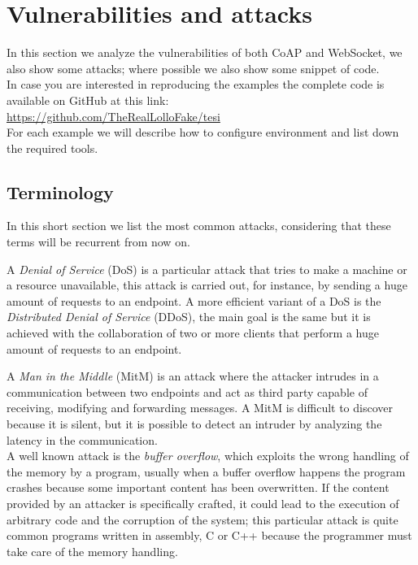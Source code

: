 	\chapter{Vulnerabilities and attacks}\label{ch:vuln}
	In this section we analyze the vulnerabilities of both CoAP and WebSocket, we also show some attacks;
	where possible we also show some snippet of code.\\
	In case you are interested in reproducing the examples the complete code is available on GitHub at this link:\\ \url{https://github.com/TheRealLolloFake/tesi}\\
	For each example we will describe how to configure environment and list down the required tools.\newline
	
	\section{Terminology}
	In this short section we list the most common attacks, considering that these terms will be recurrent from now on.\newline
	
	A \emph{Denial of Service} (DoS) is a particular attack that tries to make a machine or a resource unavailable, this
	attack is carried out, for instance, by sending a huge amount of requests to an endpoint.\newline
	A more efficient variant of a DoS is the \emph{Distributed Denial of Service} (DDoS), the main goal is the same but it is achieved
	with the collaboration of two or more clients that perform a huge amount of requests to an endpoint.\newline
	
	A \emph{Man in the Middle} (MitM) is an attack where the attacker intrudes in a communication between two endpoints
	and act as third party capable of receiving, modifying and forwarding messages.\newline
	A MitM is difficult to discover because it is silent, but it is possible to detect an intruder by analyzing
	the latency in the communication.\\
	
	
	A well known attack is the \emph{buffer overflow}, which exploits the wrong handling of the memory by a program, usually when a buffer
	overflow happens the program crashes because some  important content has been overwritten.
	If the content provided by an attacker is specifically crafted, it could lead to the execution of arbitrary code
	and the corruption of the system; this particular attack is quite common programs written in assembly, C or C++ because the programmer must take care of the memory handling.\newline
	

